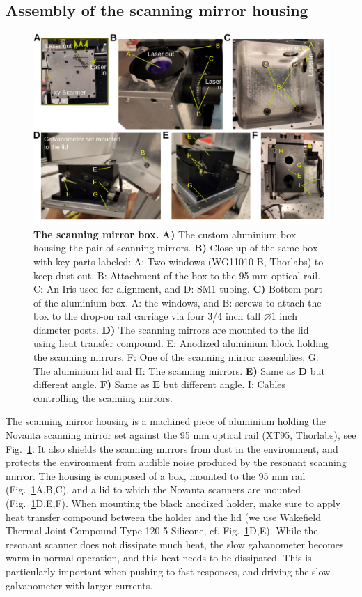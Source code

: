 \documentclass[10pt,letterpaper]{article}
\begin{document}
\subsection{Assembly of the scanning mirror housing}
%
\begin{figure}[!t]
    \includegraphics[width=\textwidth]{sfig10.jpg}
    \caption{{\bf The scanning mirror box.} \textbf{A)} The custom aluminium box housing the pair of scanning mirrors. \textbf{B)} Close-up of the same box with key parts labeled: A: Two windows (WG11010-B, Thorlabs) to keep dust out. B: Attachment of the box to the 95 mm optical rail. C: An Iris used for alignment, and D: SM1 tubing. \textbf{C)} Bottom part of the aluminium box. A: the windows, and B: screws to attach the box to the drop-on rail carriage via four 3/4 inch tall $\diameter1\text{ inch}$ diameter posts. \textbf{D)} The scanning mirrors are mounted to the lid using heat transfer compound. E: Anodized aluminium block holding the scanning mirrors. F: One of the scanning mirror assemblies, G: The aluminium lid and H: The scanning mirrors. \textbf{E)} Same as \textbf{D} but different angle. \textbf{F)} Same as \textbf{E} but different angle. I: Cables controlling the scanning mirrors.}
    \label{sfig10}
\end{figure}
%
The scanning mirror housing is a machined piece of aluminium holding the Novanta scanning mirror set against the 95 mm optical rail (XT95, Thorlabs), see Fig.~\ref{sfig10}. It also shields the scanning mirrors from dust in the environment, and protects the environment from audible noise produced by the resonant scanning mirror. The housing is composed of a box, mounted to the 95 mm rail (Fig.~\ref{sfig10}A,B,C), and a lid to which the Novanta scanners are mounted (Fig.~\ref{sfig10}D,E,F). When mounting the black anodized holder, make sure to apply heat transfer compound between the holder and the lid (we use Wakefield Thermal Joint Compound Type 120-5 Silicone, cf. Fig.~\ref{sfig10}D,E). While the resonant scanner does not dissipate much heat, the slow galvanometer becomes warm in normal operation, and this heat needs to be dissipated. This is particularly important when pushing to fast responses, and driving the slow galvanometer with larger currents.\newline
\end{document}
